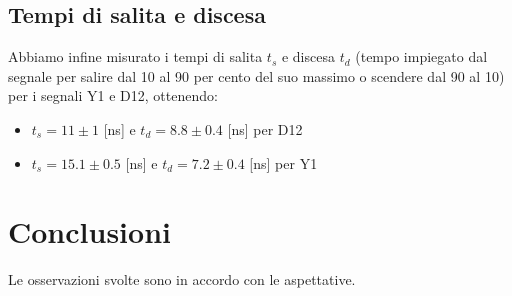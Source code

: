 \subsection{Tempi di salita e discesa}
Abbiamo infine misurato i tempi di salita $t_s$ e discesa $t_d$ (tempo impiegato dal segnale per salire dal 10 al 90 per cento del suo massimo o scendere dal 90 al 10) per i segnali Y1 e D12, ottenendo:
\begin{itemize}
\item $t_s = 11 \pm 1$ [ns] e $t_d = 8.8 \pm 0.4$ [ns] per D12
\item $t_s = 15.1 \pm 0.5$ [ns] e $t_d = 7.2 \pm 0.4$ [ns] per Y1
\end{itemize}
\section{Conclusioni}
Le osservazioni svolte sono in accordo con le aspettative.